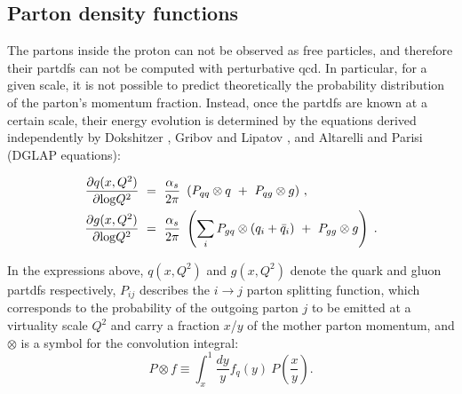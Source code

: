 


\subsection{Parton density functions}
\label{sec:protpdf}

The partons inside the proton can not be observed as free particles, and therefore their \glspl{partdf} can not be computed with
perturbative \gls{qcd}. In particular, for a given scale, it is not possible to predict theoretically the probability distribution 
of the parton's momentum fraction. Instead, once the \glspl{partdf} are known at a certain scale, their energy evolution is 
determined by the equations derived independently by Dokshitzer \cite{Dokshitzer:1977sg} , Gribov and Lipatov \cite{Gribov:1972ri}, and Altarelli and Parisi \cite{ALTARELLI1977298} (DGLAP equations):

\begin{equation}
\begin{aligned}
\frac{\partial q(x,Q^2)}{\partial {\rm log}Q^2}~&=~\frac{\alpha_s}{2\pi}~\left( P_{qq} \otimes q~+~P_{qg} \otimes g \right) \, ,\\
\frac{\partial g(x,Q^2)}{\partial {\rm log}Q^2}~&=~\frac{\alpha_s}{2\pi}~\left( \sum_i P_{gq} \otimes (q_i+\bar{q}_i)~+~P_{gg} \otimes g \right) \; .
\label{eq:glap1}
\end{aligned}
\end{equation}

\noindent In the expressions above, $q(x,Q^2)$ and $g(x,Q^2)$ denote the quark and gluon \glspl{partdf} respectively, 
$P_{ij}$ describes the $i \to j$ parton splitting function, 
which corresponds to the probability of the outgoing parton $j$ 
to be emitted at a virtuality scale $Q^2$ and carry a fraction $x$/$y$ of the mother parton momentum, 
and $\otimes$ is a symbol for the convolution integral:
\begin{equation}
P \otimes f \equiv \int^1_x\frac{dy}{y}f_q(y)~P\left(\frac{x}{y}\right).
\end{equation}

